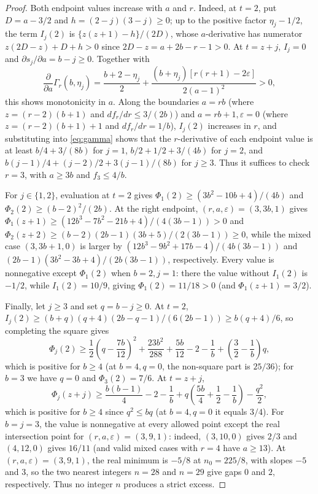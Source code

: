 \documentclass[10pt]{article}
\theoremstyle{compactplain}
\theoremstyle{remark}\newtheorem{remark}[theorem]{Remark}
\begin{document}
\begin{proof}
Both endpoint values increase with $a$ and $r$. Indeed, at $t=2$, put
$D=a-3/2$ and $h=(2-j)(3-j)\ge0$; up to the positive factor
$\eta_j-1/2$, the term $I_j(2)$ is $\{z(z+1)-h\}/(2D)$, whose
$a$-derivative has numerator $z(2D-z)+D+h>0$ since $2D-z=a+2b-r-1>0$.
At $t=z+j$, $I_j=0$ and $\partial s_j/\partial a=b-j\ge0$. Together with
\[
 \frac{\partial}{\partial a}\Gamma_r(b,\eta_j)
 =\frac{b+2-\eta_j}{2}
 +\frac{(b+\eta_j)[r(r+1)-2\varepsilon]}{2(a-1)^2}>0,
\]
this shows monotonicity in $a$. Along the boundaries $a=rb$ (where
$z=(r-2)(b+1)$ and $df_r/dr\le3/(2b)$) and $a=rb+1,\varepsilon=0$ (where
$z=(r-2)(b+1)+1$ and $df_r/dr=1/b$), $I_j(2)$ increases in $r$, and
substituting into \eqref{eq:gamma} shows that the $r$-derivative of each
endpoint value is at least $b/4+3/(8b)$ for $j=1$, $b/2+1/2+3/(4b)$ for
$j=2$, and $b(j-1)/4+(j-2)/2+3(j-1)/(8b)$ for $j\ge3$. Thus it suffices
to check $r=3$, with $a\ge3b$ and $f_3\le4/b$.

For $j\in\{1,2\}$, evaluation at $t=2$ gives
$\Phi_1(2)\ge(3b^2-10b+4)/(4b)$ and $\Phi_2(2)\ge(b-2)^2/(2b)$. At the
right endpoint, $(r,a,\varepsilon)=(3,3b,1)$ gives
$\Phi_1(z+1)\ge(12b^3-7b^2-21b+4)/(4(3b-1))>0$ and
$\Phi_2(z+2)\ge(b-2)(2b-1)(3b+5)/(2(3b-1))\ge0$, while the mixed case
$(3,3b+1,0)$ is larger by $(12b^3-9b^2+17b-4)/(4b(3b-1))$ and
$(2b-1)(3b^2-3b+4)/(2b(3b-1))$, respectively. Every value is nonnegative
except $\Phi_1(2)$ when $b=2,j=1$: there the value without $I_1(2)$ is
$-1/2$, while $I_1(2)=10/9$, giving $\Phi_1(2)=11/18>0$ (and
$\Phi_1(z+1)=3/2$).

Finally, let $j\ge3$ and set $q=b-j\ge0$. At $t=2$,
$I_j(2)\ge(b+q)(q+4)(2b-q-1)/(6(2b-1))\ge b(q+4)/6$, so completing the
square gives
\[
 \Phi_j(2)\ge\frac{1}{2}\left(q-\frac{7b}{12}\right)^2
 +\frac{23b^2}{288}+\frac{5b}{12}-2-\frac{1}{b}
 +\left(\frac{3}{2}-\frac{1}{b}\right)q,
\]
which is positive for $b\ge4$ (at $b=4,q=0$, the non-square part is
$25/36$); for $b=3$ we have $q=0$ and $\Phi_3(2)=7/6$. At $t=z+j$,
\[
 \Phi_j(z+j)\ge\frac{b(b-1)}{4}-2-\frac{1}{b}
 +q\left(\frac{5b}{4}+\frac{1}{2}-\frac{1}{b}\right)-\frac{q^2}{2},
\]
which is positive for $b\ge4$ since $q^2\le bq$ (at $b=4,q=0$ it equals
$3/4$). For $b=j=3$, the value is nonnegative at every allowed point
except the real intersection point for $(r,a,\varepsilon)=(3,9,1)$:
indeed, $(3,10,0)$ gives $2/3$ and $(4,12,0)$ gives $16/11$ (and valid
mixed cases with $r=4$ have $a\ge13$). At $(r,a,\varepsilon)=(3,9,1)$,
the real minimum is $-5/8$ at $n_0=225/8$, with slopes $-5$ and $3$, so
the two nearest integers $n=28$ and $n=29$ give gaps $0$ and $2$,
respectively. Thus no integer $n$ produces a strict excess.
\end{proof}
\end{document}
